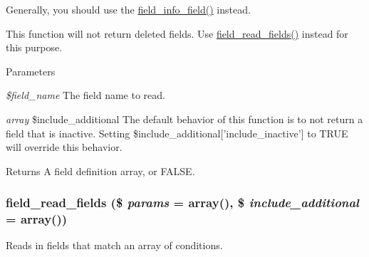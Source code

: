 Generally, you should use the \hyperlink{group__field__info_ga74cfc942cd2baa5c49780b08c5d357d4}{field\_\-info\_\-field()} instead.

This function will not return deleted fields. Use \hyperlink{group__field__crud_ga0dae5c311ea301668c8906d2711fb3c5}{field\_\-read\_\-fields()} instead for this purpose.


\begin{DoxyParams}{Parameters}
\item[{\em \$field\_\-name}]The field name to read. \item[{\em array}]\$include\_\-additional The default behavior of this function is to not return a field that is inactive. Setting \$include\_\-additional\mbox{[}'include\_\-inactive'\mbox{]} to TRUE will override this behavior. \end{DoxyParams}
\begin{DoxyReturn}{Returns}
A field definition array, or FALSE. 
\end{DoxyReturn}
\hypertarget{group__field__crud_ga0dae5c311ea301668c8906d2711fb3c5}{
\subsubsection[{field\_\-read\_\-fields}]{\setlength{\rightskip}{0pt plus 5cm}field\_\-read\_\-fields (\$ {\em params} = {\ttfamily array()}, \/  \$ {\em include\_\-additional} = {\ttfamily array()})}}
\label{group__field__crud_ga0dae5c311ea301668c8906d2711fb3c5}
Reads in fields that match an array of conditions.


